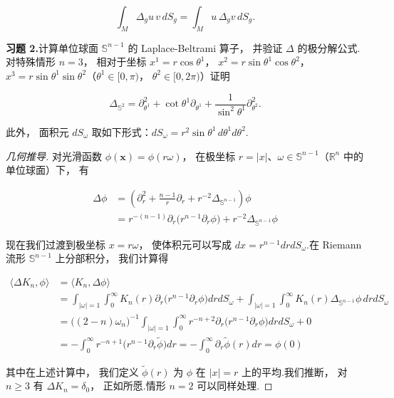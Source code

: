 \[
\int_{M}\Delta_{g}u\, v\, dS_{g} = \int_{M}u\, \Delta_{g}v\, dS_{g}.
\]

\noindent\textbf{习题 2.}\quad 计算单位球面 $\mathbb{S}^{n-1}$ 的 Laplace-Beltrami 算子， 并验证 $\Delta$ 的极分解公式.对特殊情形 $n = 3$， 相对于坐标 $x^{1} = r\cos\theta^{1}$， $x^{2} = r\sin\theta^{1}\cos\theta^{2}$， $x^{3} = r\sin\theta^{1}\sin\theta^{2}$（$\theta^{1} \in [0, \pi)$， $\theta^{2} \in [0, 2\pi)$）证明

\[
\Delta_{\mathbb{S}^{2}} = \partial_{\theta^{1}}^{2} + \cot\theta^{1}\partial_{\theta^{1}} + \frac{1}{\sin^{2}\theta^{1}}\partial_{\theta^{2}}^{2}.
\]

此外， 面积元 $dS_{\omega}$ 取如下形式：$dS_{\omega} = r^{2}\sin\theta^{1}\, d\theta^{1}d\theta^{2}$.

\begin{proof}[几何推导]
对光滑函数 $\phi(\boldsymbol{x}) = \phi(r\omega)$， 在极坐标 $r = |x|$、$\omega \in \mathbb{S}^{n-1}$（$\mathbb{R}^{n}$ 中的单位球面）下， 有

\[
\begin{aligned}
\Delta\phi &= \left(\partial_{r}^{2} + \frac{n-1}{r}\partial_{r} + r^{-2}\Delta_{\mathbb{S}^{n-1}}\right)\phi \\
&= r^{-(n-1)}\partial_{r}\bigl(r^{n-1}\partial_{r}\phi\bigr) + r^{-2}\Delta_{\mathbb{S}^{n-1}}\phi
\end{aligned}
\]

现在我们过渡到极坐标 $x = r\omega$， 使体积元可以写成 $dx = r^{n-1}drdS_{\omega}$.在 Riemann 流形 $\mathbb{S}^{n-1}$ 上分部积分， 我们计算得

\[
\begin{aligned}
\langle \Delta K_{n}, \phi\rangle &= \langle K_{n}, \Delta\phi\rangle \\
&= \int_{|\omega|=1}\int_{0}^{\infty}K_{n}(r)\partial_{r}\bigl(r^{n-1}\partial_{r}\phi\bigr)drdS_{\omega} + \int_{|\omega|=1}\int_{0}^{\infty}K_{n}(r)\Delta_{\mathbb{S}^{n-1}}\phi\, drdS_{\omega} \\
&= \bigl((2-n)\omega_{n}\bigr)^{-1}\int_{|\omega|=1}\int_{0}^{\infty}r^{-n+2}\partial_{r}\bigl(r^{n-1}\partial_{r}\phi\bigr)drdS_{\omega} + 0 \\
&= -\int_{0}^{\infty}r^{-n+1}\bigl(r^{n-1}\partial_{r}\tilde{\phi}\bigr)dr = -\int_{0}^{\infty}\partial_{r}\tilde{\phi}(r)dr = \phi(0)
\end{aligned}
\]

其中在上述计算中， 我们定义 $\tilde{\phi}(r)$ 为 $\phi$ 在 $|x| = r$ 上的平均.我们推断， 对 $n \geq 3$ 有 $\Delta K_{n} = \delta_{0}$， 正如所愿.情形 $n = 2$ 可以同样处理.
\end{proof}

